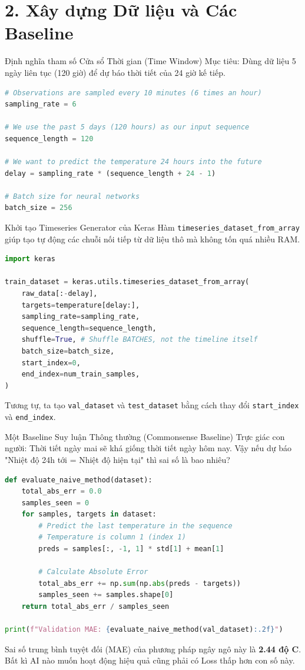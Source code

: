 \documentclass[aspectratio=169]{beamer}
\begin{document}
\section{2. Xây dựng Dữ liệu và Các Baseline}

\begin{frame}[fragile]{Định nghĩa tham số Cửa sổ Thời gian (Time Window)}
Mục tiêu: Dùng dữ liệu 5 ngày liên tục (120 giờ) để dự báo thời tiết của 24 giờ kế tiếp.
\begin{lstlisting}[language=Python]
# Observations are sampled every 10 minutes (6 times an hour)
sampling_rate = 6

# We use the past 5 days (120 hours) as our input sequence
sequence_length = 120

# We want to predict the temperature 24 hours into the future
delay = sampling_rate * (sequence_length + 24 - 1)

# Batch size for neural networks
batch_size = 256
\end{lstlisting}
\end{frame}

\begin{frame}[fragile]{Khởi tạo Timeseries Generator của Keras}
Hàm \texttt{timeseries\_dataset\_from\_array} giúp tạo tự động các chuỗi nối tiếp từ dữ liệu thô mà không tốn quá nhiều RAM.
\begin{lstlisting}[language=Python]
import keras

train_dataset = keras.utils.timeseries_dataset_from_array(
    raw_data[:-delay],
    targets=temperature[delay:],
    sampling_rate=sampling_rate,
    sequence_length=sequence_length,
    shuffle=True, # Shuffle BATCHES, not the timeline itself
    batch_size=batch_size,
    start_index=0,
    end_index=num_train_samples,
)
\end{lstlisting}
Tương tự, ta tạo \texttt{val\_dataset} và \texttt{test\_dataset} bằng cách thay đổi \texttt{start\_index} và \texttt{end\_index}.
\end{frame}

\begin{frame}[fragile]{Một Baseline Suy luận Thông thường (Commonsense Baseline)}
Trực giác con người: Thời tiết ngày mai sẽ khá giống thời tiết ngày hôm nay. Vậy nếu dự báo "Nhiệt độ 24h tới = Nhiệt độ hiện tại" thì sai số là bao nhiêu?
\begin{lstlisting}[language=Python]
def evaluate_naive_method(dataset):
    total_abs_err = 0.0
    samples_seen = 0
    for samples, targets in dataset:
        # Predict the last temperature in the sequence
        # Temperature is column 1 (index 1)
        preds = samples[:, -1, 1] * std[1] + mean[1]
        
        # Calculate Absolute Error
        total_abs_err += np.sum(np.abs(preds - targets))
        samples_seen += samples.shape[0]
    return total_abs_err / samples_seen

print(f"Validation MAE: {evaluate_naive_method(val_dataset):.2f}")
\end{lstlisting}
Sai số trung bình tuyệt đối (MAE) của phương pháp ngây ngô này là \textbf{2.44 độ C}. Bất kì AI nào muốn hoạt động hiệu quả cũng phải có Loss thấp hơn con số này.
\end{frame}
\end{document}
